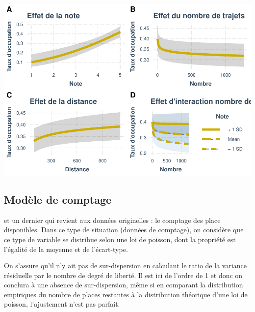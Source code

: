 \documentclass[
]{book}
\begin{document}
\includegraphics{bookdown-demo_files/figure-latex/0912-2.pdf}

\hypertarget{moduxe8le-de-comptage}{%
\subsection{Modèle de comptage}\label{moduxe8le-de-comptage}}

et un dernier qui revient aux données originelles : le comptage des place disponibles. Dans ce type de situation (données de comptage), on considère que ce type de variable se distribue selon une loi de poisson, dont la propriété est l'égalité de la moyenne et de l'écart-type.

On s'assure qu'il n'y ait pas de sur-dispersion en calculant le ratio de la variance résiduelle par le nombre de degré de liberté. Il est ici de l'ordre de 1 et donc on conclura à une absence de sur-dispersion, même si en comparant la distribution empiriques du nombre de places restantes à la distribution théorique d'une loi de poisson, l'ajustement n'est pas parfait.
\end{document}
